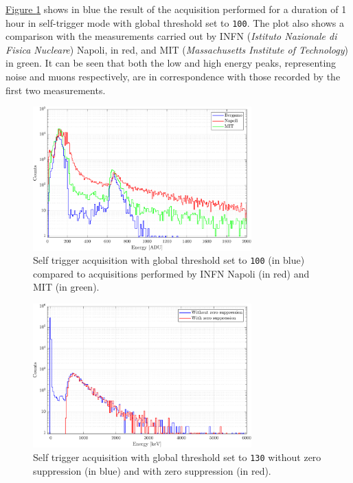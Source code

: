 \par
\hyperref[figMUONSconfronto]{Figure \ref{figMUONSconfronto}} shows in blue the result of the acquisition performed for a duration of 1 hour in self-trigger mode with global threshold set to \texttt{100}. The plot also shows a comparison with the measurements carried out by INFN (\textit{Istituto Nazionale di Fisica Nucleare}) Napoli, in red, and MIT (\textit{Massachusetts Institute of Technology}) in green. It can be seen that both the low and high energy peaks, representing noise and muons respectively, are in correspondence with those recorded by the first two measurements.

\begin{figure}[h!]
    \centering
    \includegraphics[width=0.75\textwidth]{Images/chap3/results/muons/incoming_energy_comparison.pdf}
    \caption{ Self trigger acquisition with global threshold set to \texttt{100} (in blue) compared to acquisitions performed by INFN Napoli (in red) and MIT (in green).}
    \label{figMUONSconfronto}
\end{figure}

\begin{figure}[h!]
    \centering
    \includegraphics[width=0.75\textwidth]{Images/chap3/results/muons/incoming_energy_zero_suppr_thr130_keV.pdf} %
    \caption{Self trigger acquisition with global threshold set to \texttt{130} without zero suppression (in blue) and with zero suppression (in red).}
    \label{figMUONselfZS}
\end{figure}

